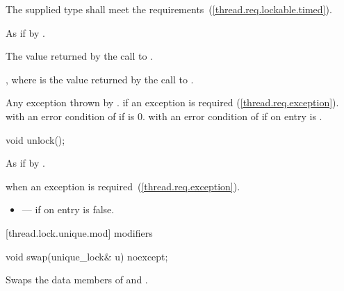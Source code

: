 \begin{itemdescr}
\pnum
\requires The supplied  type shall meet the  requirements~(\ref{thread.req.lockable.timed}).

\pnum
\effects As if by .

\pnum
\returns The value returned by the call to .

\pnum
\postcondition {}, where  is the value returned by the call to .

\pnum
\throws Any exception thrown by .  if an
exception is required (\ref{thread.req.exception}).  with an error
condition of  if  is 0.  with an
error condition of  if on entry  is
.
\end{itemdescr}

%
%
\begin{itemdecl}
void unlock();
\end{itemdecl}

\begin{itemdescr}
\pnum\effects As if by .

\pnum\postcondition {}

\pnum\throws {} when
an exception is required~(\ref{thread.req.exception}).

\pnum \errors
\begin{itemize}
\item {} --- if on entry  is false.
\end{itemize}
\end{itemdescr}

[thread.lock.unique.mod]{ modifiers}

%
%
\begin{itemdecl}
void swap(unique_lock& u) noexcept;
\end{itemdecl}

\begin{itemdescr}
\pnum\effects Swaps the data members of  and .
\end{itemdescr}

